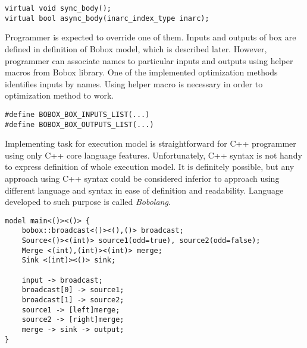 \begin{lstlisting}[caption={Code representation of box action step.}]
virtual void sync_body();
virtual bool async_body(inarc_index_type inarc);
\end{lstlisting}

Programmer is expected to override one of them. Inputs and outputs of box are defined in definition of Bobox model, which is described later. However, programmer can associate names to particular inputs and outputs using helper macros from Bobox library. One of the implemented optimization methods identifies inputs by names. Using helper macro is necessary in order to optimization method to work.

\begin{lstlisting}[caption={Helper macros for mapping of names to inputs and outputs.}]
#define BOBOX_BOX_INPUTS_LIST(...)
#define BOBOX_BOX_OUTPUTS_LIST(...)
\end{lstlisting}

Implementing task for execution model is straightforward for C++ programmer using only C++ core language features. Unfortunately, C++ syntax is not handy to express definition of whole execution model. It is definitely possible, but any approach using C++ syntax could be considered inferior to approach using different language and syntax in ease of definition and readability. Language developed to such purpose is called \emph{Bobolang}.

\begin{lstlisting}[caption={Example of Bobolang usage from Bobox project.}]
model main<()><()> {
	bobox::broadcast<()><(),()> broadcast;
	Source<()><(int)> source1(odd=true), source2(odd=false);
	Merge <(int),(int)><(int)> merge;
	Sink <(int)><()> sink;
	
	input -> broadcast;
	broadcast[0] -> source1;
	broadcast[1] -> source2;
	source1 -> [left]merge;
	source2 -> [right]merge;
	merge -> sink -> output;
}
\end{lstlisting}
